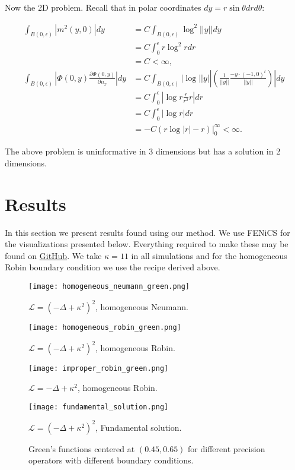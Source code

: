 \documentclass[paper=a4, fontsize=11pt]{scrartcl} %
\numberwithin{equation}{section} %
\numberwithin{figure}{section} %
\numberwithin{table}{section} %
\newcommand{\Op}{\mathcal{L}}
\begin{document}
Now the 2D problem. Recall that in polar coordinates $dy = r\sin \theta dr d\theta$:

\begin{align*}
     \int_{B(0,\epsilon)} |m^2(y,0)|dy &= C \int_{B(0,\epsilon)} \log^2||y|| dy \\
    &= C \int_{0}^{\epsilon} r \log^2 r dr \\
    &= C < \infty, \\
    \int_{B(0,\epsilon)} |\Phi(0,y) \frac{\partial \Phi(0,y)}{\partial n_x}| dy &= C \int_{B(0,\epsilon)} |\log||y|| (\frac{1}{||y||} \frac{-y\cdot (-1,0)^t}{||y||})| dy\\
    &= C\int_{0}^{\epsilon} |\log r\frac{r }{r^2}r| dr\\
    &= C \int_{0}^{\epsilon} |\log r| dr \\
    &= -C(r \log |r| - r)|_{0}^{\infty} < \infty.
\end{align*}

The above problem is uninformative in 3 dimensions but has a solution in 2 dimensions.

\section{Results}
In this section we present results found using our method. We use FENiCS \cite{fenics} for
the visualizations presented below. Everything required to make these may be found on 
\href{https://github.com/yairdaon/covariances}{GitHub}. We take $\kappa = 11$ 
in all simulations and for the homogeneous Robin boundary condition we use the
recipe derived above.

\begin{figure}[!htb]
  \texttt{[image: homogeneous\_neumann\_green.png]}
   \caption*{$\Op = (-\Delta + \kappa^2)^2$, homogeneous Neumann.}
\endminipage\hfill
{}
  \texttt{[image: homogeneous\_robin\_green.png]}
   \caption*{$\Op = (-\Delta + \kappa^2)^2$, homogeneous Robin.}
\endminipage\hfill

  \texttt{[image: improper\_robin\_green.png]}
   \caption*{$\Op = -\Delta + \kappa^2$, homogeneous Robin.}
\endminipage\hfill
{}
  \texttt{[image: fundamental\_solution.png]}
   \caption*{$\Op = (-\Delta + \kappa^2)^2$, Fundamental solution.}
\endminipage
 \caption{Green's functions centered at $(0.45,0.65)$ for 
   different precision operators with different boundary conditions.}
 \label{green}
\end{figure}
 
\end{document}
